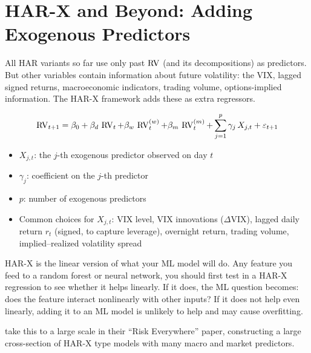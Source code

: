 \section{HAR-X and Beyond: Adding Exogenous Predictors}
\label{sec:har-x}

All HAR variants so far use only past $\operatorname{RV}$ (and its decompositions) as predictors.
But other variables contain information about future volatility: the VIX, lagged signed returns, macroeconomic indicators, trading volume, options-implied information.
The HAR-X framework adds these as extra regressors.

\begin{definition}[HAR-X]
\begin{equation}
  \operatorname{RV}_{t+1} = \beta_0 + \beta_d \, \operatorname{RV}_t + \beta_w \, \operatorname{RV}^{(w)}_t + \beta_m \, \operatorname{RV}^{(m)}_t
             + \sum_{j=1}^{p} \gamma_j \, X_{j,t} + \varepsilon_{t+1}
  \label{eq:har-x}
\end{equation}
\begin{itemize}[nosep]
  \item $X_{j,t}$: the $j$-th exogenous predictor observed on day $t$
  \item $\gamma_j$: coefficient on the $j$-th predictor
  \item $p$: number of exogenous predictors
  \item Common choices for $X_{j,t}$: VIX level, VIX innovations ($\Delta$VIX), lagged daily return $r_t$ (signed, to capture leverage), overnight return, trading volume, implied--realized volatility spread
\end{itemize}
\end{definition}

\begin{projectconnection}
HAR-X is the linear version of what your ML model will do.
Any feature you feed to a random forest or neural network, you should first test in a HAR-X regression to see whether it helps linearly.
If it does, the ML question becomes: does the feature interact nonlinearly with other inputs?
If it does not help even linearly, adding it to an ML model is unlikely to help and may cause overfitting.
\end{projectconnection}

\citet{BollerslevEtAl2018} take this to a large scale in their ``Risk Everywhere'' paper, constructing a large cross-section of HAR-X type models with many macro and market predictors.

